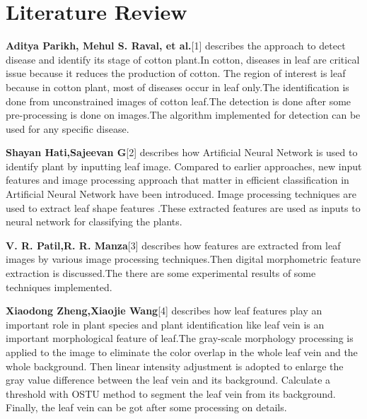 \documentclass[conference]{IEEEtran}
\begin{document}
\bigskip
\bigskip
\section{Literature Review}
\textbf{Aditya Parikh, Mehul S. Raval, et al.}[1]  describes the approach to detect disease and identify its stage of cotton plant.In cotton, diseases in leaf are critical issue because it reduces the production of cotton. The region of interest is leaf because in cotton plant, most of diseases occur in leaf only.The identification is done from unconstrained images of cotton leaf.The detection is done after some pre-processing is done on images.The algorithm implemented for detection can be used for any specific disease.   

\vspace{3mm}

\textbf{Shayan Hati,Sajeevan G}[2] describes how Artificial Neural Network is used to identify plant by inputting leaf image. Compared to earlier approaches, new input features and image processing approach that matter in efficient classification in Artificial Neural Network have been introduced. Image processing techniques are used to extract leaf shape features .These extracted features are used as inputs to neural network for classifying the plants.

\vspace{3mm}

\textbf{V. R. Patil,R. R. Manza}[3] describes how features are extracted from leaf images by various image processing techniques.Then digital morphometric feature extraction is discussed.The there are some experimental results of some techniques implemented.

\vspace{3mm}

\textbf{Xiaodong Zheng,Xiaojie Wang}[4] describes how leaf features play an important role in plant species and plant identification like leaf vein is an important morphological feature of leaf.The gray-scale morphology processing is applied to the image to eliminate the color overlap in the whole leaf vein and the whole background. Then linear intensity adjustment is adopted to enlarge the gray value difference between the leaf vein and its background. Calculate a threshold with OSTU method to segment the leaf vein from its background. Finally, the leaf vein can be got after some processing on details.

\vspace{3mm}
\end{document}
